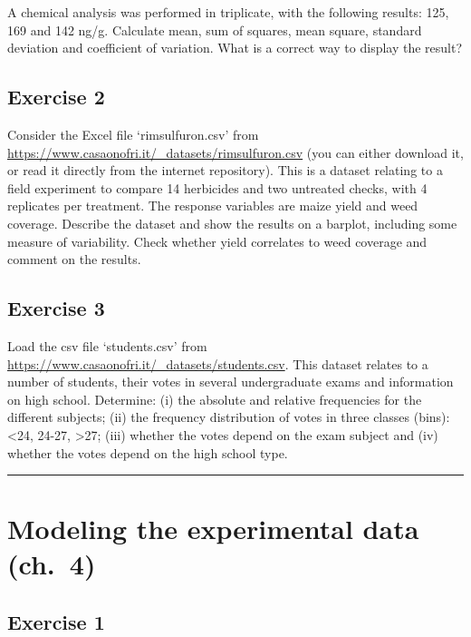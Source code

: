 \documentclass[a4paper,12pt,oneside]{book}
\begin{document}
A chemical analysis was performed in triplicate, with the following results: 125, 169 and 142 ng/g. Calculate mean, sum of squares, mean square, standard deviation and coefficient of variation. What is a correct way to display the result?

\hypertarget{exercise-2-1}{%
\subsection{Exercise 2}\label{exercise-2-1}}

Consider the Excel file `rimsulfuron.csv' from \url{https://www.casaonofri.it/_datasets/rimsulfuron.csv} (you can either download it, or read it directly from the internet repository). This is a dataset relating to a field experiment to compare 14 herbicides and two untreated checks, with 4 replicates per treatment. The response variables are maize yield and weed coverage. Describe the dataset and show the results on a barplot, including some measure of variability. Check whether yield correlates to weed coverage and comment on the results.

\hypertarget{exercise-3-1}{%
\subsection{Exercise 3}\label{exercise-3-1}}

Load the csv file `students.csv' from \url{https://www.casaonofri.it/_datasets/students.csv}. This dataset relates to a number of students, their votes in several undergraduate exams and information on high school. Determine: (i) the absolute and relative frequencies for the different subjects; (ii) the frequency distribution of votes in three classes (bins): \textless24, 24-27, \textgreater27; (iii) whether the votes depend on the exam subject and (iv) whether the votes depend on the high school type.

\begin{center}\rule{0.5\linewidth}{0.5pt}\end{center}

\hypertarget{modeling-the-experimental-data-ch.-4}{%
\section{Modeling the experimental data (ch.~4)}\label{modeling-the-experimental-data-ch.-4}}

\hypertarget{exercise-1-1}{%
\subsection{Exercise 1}\label{exercise-1-1}}
\end{document}
